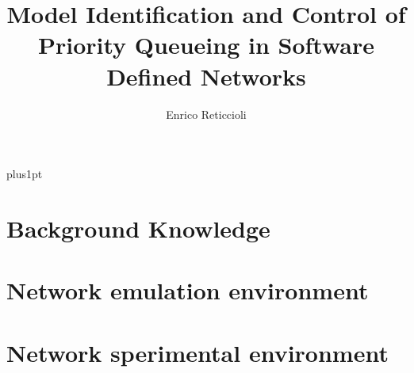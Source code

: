 \documentclass[12pt, a4paper, twoside, openright]{ociamthesis}  %
\title{Model Identification and Control of Priority Queueing in Software Defined Networks} %
\author{Enrico Reticcioli}             %
\begin{document}
\baselineskip=18pt plus1pt

\setcounter{secnumdepth}{4}
\setcounter{tocdepth}{4}

\maketitle                  %




\begin{romanpages}          %
\tableofcontents            %
\listoffigures              %
\listoftables               %
\end{romanpages}            %

%



\chapter{Background Knowledge}


%
\chapter{Network emulation environment}


\chapter{Network sperimental environment}

\end{document}
